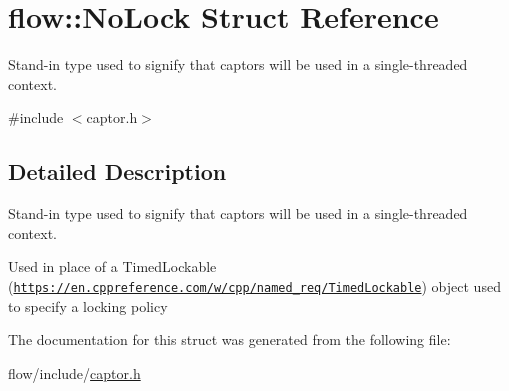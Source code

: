 \hypertarget{structflow_1_1_no_lock}{}\section{flow\+:\+:No\+Lock Struct Reference}
\label{structflow_1_1_no_lock}


Stand-\/in type used to signify that captors will be used in a single-\/threaded context.  




{\ttfamily \#include $<$captor.\+h$>$}



\subsection{Detailed Description}
Stand-\/in type used to signify that captors will be used in a single-\/threaded context. 

Used in place of a Timed\+Lockable (\href{https://en.cppreference.com/w/cpp/named_req/TimedLockable}{\tt https\+://en.\+cppreference.\+com/w/cpp/named\+\_\+req/\+Timed\+Lockable}) object used to specify a locking policy 

The documentation for this struct was generated from the following file\+:\begin{DoxyCompactItemize}
\item 
flow/include/\hyperlink{captor_8h}{captor.\+h}\end{DoxyCompactItemize}
